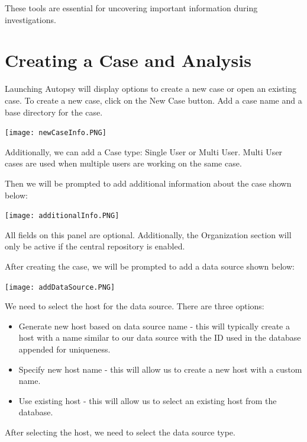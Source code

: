 \documentclass{article}
\begin{document}
These tools are essential for uncovering important information during investigations.

\section{Creating a Case and Analysis}

Launching Autopsy will display options to create a new case or open an existing case. To create a new case, click on the New Case button. Add a case name and a base directory for the case.

\begin{center}
    \texttt{[image: newCaseInfo.PNG]}
\end{center}

Additionally, we can add a Case type: Single User or Multi User. Multi User cases are used when multiple users are working on the same case.

Then we will be prompted to add additional information about the case shown below:

\begin{center}
    \texttt{[image: additionalInfo.PNG]}
\end{center}

All fields on this panel are optional. Additionally, the Organization section will only be active if the central repository is enabled.

After creating the case, we will be prompted to add a data source shown below:

\begin{center}
    \texttt{[image: addDataSource.PNG]}
\end{center}

We need to select the host for the data source. There are three options:

\begin{itemize}
    \item Generate new host based on data source name - this will typically create a host with a name similar to our data source with the ID used in the database appended for uniqueness.
    \item Specify new host name - this will allow us to create a new host with a custom name.
    \item Use existing host - this will allow us to select an existing host from the database.
\end{itemize}

After selecting the host, we need to select the data source type.
\end{document}
